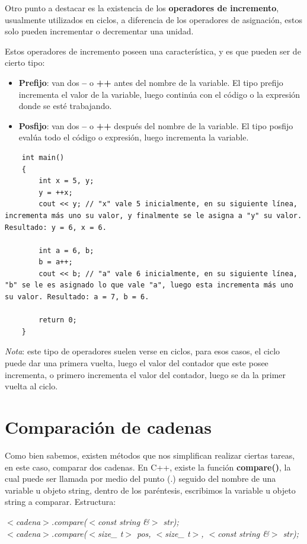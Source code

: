 Otro punto a destacar es la existencia de los \textbf{operadores de incremento}, usualmente utilizados en ciclos, a diferencia de los operadores de asignación, estos solo pueden incrementar o decrementar  una unidad.

Estos operadores de incremento poseen una característica, y es que pueden ser de cierto tipo:
\begin{itemize}
    \item \textbf{Prefijo}: van dos \textbf{--} o \textbf{++} antes del nombre de la variable. El tipo prefijo incrementa el valor de la variable, luego continúa con el código o la expresión donde se esté trabajando.
    \item \textbf{Posfijo}: van dos \textbf{--} o \textbf{++} después del nombre de la variable. El tipo posfijo evalúa todo el código o expresión, luego incrementa la variable.
\end{itemize}
\begin{lstlisting}
    int main()
    {
        int x = 5, y;
        y = ++x;
        cout << y; // "x" vale 5 inicialmente, en su siguiente línea, incrementa más uno su valor, y finalmente se le asigna a "y" su valor. Resultado: y = 6, x = 6.
        
        int a = 6, b;
        b = a++;
        cout << b; // "a" vale 6 inicialmente, en su siguiente línea, "b" se le es asignado lo que vale "a", luego esta incrementa más uno su valor. Resultado: a = 7, b = 6.
        
        return 0;
    }
\end{lstlisting}

\textit{Nota}: este tipo de operadores suelen verse en ciclos, para esos casos, el ciclo puede dar una primera vuelta, luego el valor del contador que este posee incrementa, o primero incrementa el valor del contador, luego se da la primer vuelta al ciclo.



\section{Comparación de cadenas}
\hspace{0.55cm}Como bien sabemos, existen métodos que nos simplifican realizar ciertas tareas, en este caso, comparar dos cadenas. En C++, existe la función \textbf{compare()}, la cual puede ser llamada por medio del punto (.) seguido del nombre de una variable u objeto string, dentro de los paréntesis, escribimos la variable u objeto string a comparar. Estructura:
\begin{center}
	\textit{
		$<$cadena$>$.compare($<$const string \&$>$ str); \\
		$<$cadena$>$.compare($<$size\_ t$>$ pos, $<$size\_ t$>$, $<$const string \&$>$ str);
	}
\end{center}

